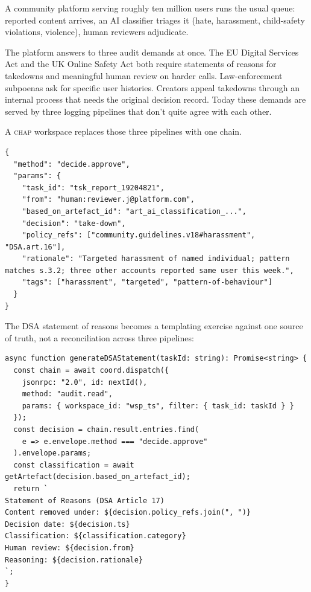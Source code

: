 \documentclass[11pt]{article}
\newcommand{\chap}{\textsc{chap}}
\begin{document}
A community platform serving roughly ten million users runs the usual queue: reported content arrives, an AI classifier triages it (hate, harassment, child-safety violations, violence), human reviewers adjudicate.

The platform answers to three audit demands at once. The EU Digital Services Act and the UK Online Safety Act both require statements of reasons for takedowns and meaningful human review on harder calls. Law-enforcement subpoenas ask for specific user histories. Creators appeal takedowns through an internal process that needs the original decision record. Today these demands are served by three logging pipelines that don't quite agree with each other.

A \chap{} workspace replaces those three pipelines with one chain.

\begin{lstlisting}[caption={Takedown decision with policy citations.},label={lst:case7-decide}]
{
  "method": "decide.approve",
  "params": {
    "task_id": "tsk_report_19204821",
    "from": "human:reviewer.j@platform.com",
    "based_on_artefact_id": "art_ai_classification_...",
    "decision": "take-down",
    "policy_refs": ["community.guidelines.v18#harassment", "DSA.art.16"],
    "rationale": "Targeted harassment of named individual; pattern matches s.3.2; three other accounts reported same user this week.",
    "tags": ["harassment", "targeted", "pattern-of-behaviour"]
  }
}
\end{lstlisting}

The DSA statement of reasons becomes a templating exercise against one source of truth, not a reconciliation across three pipelines:

\begin{lstlisting}[caption={Generating a DSA statement of reasons.},label={lst:case7-statement}]
async function generateDSAStatement(taskId: string): Promise<string> {
  const chain = await coord.dispatch({
    jsonrpc: "2.0", id: nextId(),
    method: "audit.read",
    params: { workspace_id: "wsp_ts", filter: { task_id: taskId } }
  });
  const decision = chain.result.entries.find(
    e => e.envelope.method === "decide.approve"
  ).envelope.params;
  const classification = await getArtefact(decision.based_on_artefact_id);
  return `
Statement of Reasons (DSA Article 17)
Content removed under: ${decision.policy_refs.join(", ")}
Decision date: ${decision.ts}
Classification: ${classification.category}
Human review: ${decision.from}
Reasoning: ${decision.rationale}
`;
}
\end{lstlisting}
\end{document}
